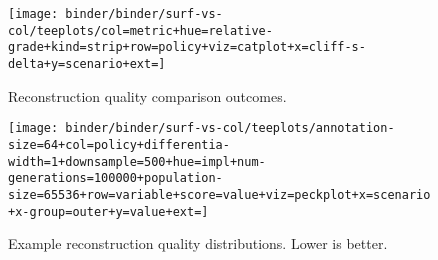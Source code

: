 \begin{figure*}
  \centering
  \begin{subfigure}[b]{0.5\textwidth}
    \centering
    \texttt{[image: binder/binder/surf-vs-col/teeplots/col=metric+hue=relative-grade+kind=strip+row=policy+viz=catplot+x=cliff-s-delta+y=scenario+ext=]}
    \caption{Reconstruction quality comparison outcomes.}
  \label{fig:col-vs-surf-overview}
  \end{subfigure}%
  \begin{subfigure}[b]{0.5\textwidth}
    \centering
    \texttt{[image: binder/binder/surf-vs-col/teeplots/annotation-size=64+col=policy+differentia-width=1+downsample=500+hue=impl+num-generations=100000+population-size=65536+row=variable+score=value+viz=peckplot+x=scenario+x-group=outer+y=value+ext=]}
    \caption{Example reconstruction quality distributions. Lower is better.}
    \label{fig:col-vs-surf-example}
  \end{subfigure}
  \caption{%
    \textbf{Does column- or surface-based instrumentation give higher-quality reconstruction?}
    \footnotesize
    Subpanel \ref{fig:col-vs-surf-overview} shows effect sizes of column-vs-surface comparisons for triplet distance and inner node loss metrics across sensitivity analysis conditions.
    Color coding indicates a significant outcome (Mann-Whitney U).
    Surface tends to outperform column under tilted policy and vice versa under steady policy.
    Subpanel \ref{fig:col-vs-surf-example} shows reconstruction quality effects for 64-bit size, bit-differentia annotations with population size 65,536, downsample size 500, and 100k generations.
    Background hatching indicates significant outcome.
    See Figure \ref{fig:col-vs-surf} in our Code, Data, \& Materials for a listing of effects by sensitivity analysis condition \citep{moreno2024supplemental}.
  }
  \label{fig:col-vs-surf-summary}
\end{figure*}
